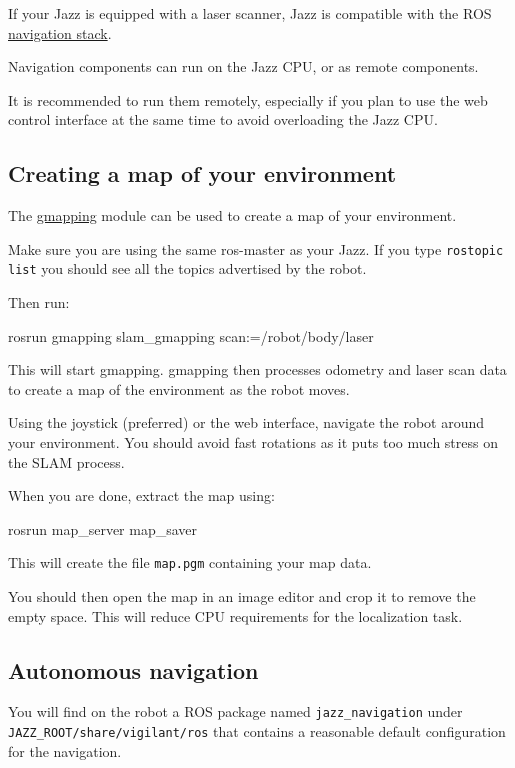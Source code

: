 If your Jazz is equipped with a laser scanner, Jazz is compatible with the
ROS \href{http://www.ros.org/wiki/navigation}{navigation stack}.

Navigation components can run on the Jazz CPU, or as remote components.

It is recommended to run them remotely, especially if you plan to use the
web control interface at the same time to avoid overloading the Jazz CPU.

\subsection{Creating a map of your environment}

The \href{http://www.ros.org/wiki/gmapping}{gmapping} module can be used to
create a map of your environment.

Make sure you are using the same ros-master as your Jazz. If you type
\lstinline|rostopic list| you should see all the topics advertised by the robot.

Then run:

\begin{shell}
rosrun gmapping slam_gmapping scan:=/robot/body/laser
\end{shell}

This will start gmapping. gmapping then processes odometry and laser scan data
to create a map of the environment as the robot moves.

Using the joystick (preferred) or the web interface, navigate the robot around
your environment. You should avoid fast rotations as it puts too much stress
on the SLAM process.

When you are done, extract the map using:

\begin{shell}
rosrun map_server map_saver
\end{shell}

This will create the file \lstinline|map.pgm| containing your map data.

You should then open the map in an image editor and crop it to remove the
empty space. This will reduce CPU requirements for the localization task.

\subsection{Autonomous navigation}

You will find on the robot a ROS package named \lstinline|jazz_navigation| under
\lstinline|JAZZ_ROOT/share/vigilant/ros| that
contains a reasonable default configuration for the navigation.

